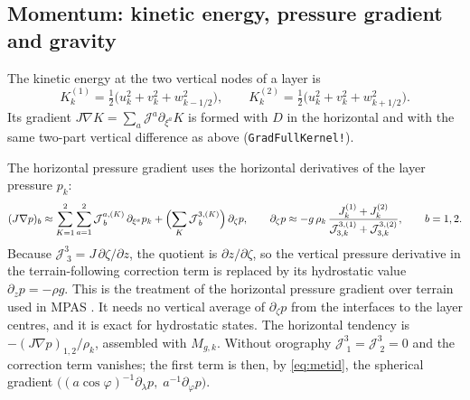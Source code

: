 \documentclass[11pt,a4paper]{article}
\newcommand{\Jm}{\mathcal{J}}
\newcommand{\code}[1]{\texttt{#1}}
\begin{document}
\subsection{Momentum: kinetic energy, pressure gradient and gravity}

The kinetic energy at the two vertical nodes of a layer is
\begin{equation}
  K^{(1)}_k = \tfrac12\bigl(u_k^2 + v_k^2 + w_{k-1/2}^2\bigr),\qquad
  K^{(2)}_k = \tfrac12\bigl(u_k^2 + v_k^2 + w_{k+1/2}^2\bigr).
\end{equation}
Its gradient $J\nabla K = \sum_a\Jm^a\partial_{\xi^a}K$ is formed with $D$ in
the horizontal and with the same two-part vertical difference as above
(\code{GradFullKernel!}).

The horizontal pressure gradient uses the horizontal derivatives of the
layer pressure $p_k$:
\begin{equation}
  (J\nabla p)_b \approx \sum_{K=1}^2\sum_{a=1}^2 \Jm^{a,(K)}_{\;b}\,\partial_{\xi^a}p_k
  + \Bigl(\sum_{K}\Jm^{3,(K)}_{\;b}\Bigr)\,\partial_\zeta p,
  \qquad
  \partial_\zeta p \approx -g\,\rho_k\,
  \frac{J^{(1)}_k + J^{(2)}_k}{\Jm^{3,(1)}_{3,k} + \Jm^{3,(2)}_{3,k}},
  \qquad b = 1,2.
\end{equation}
Because $\Jm^3_{\;3} = J\,\partial\zeta/\partial z$, the quotient is
$\partial z/\partial\zeta$, so the vertical pressure derivative in the
terrain-following correction term is replaced by its hydrostatic value
$\partial_z p = -\rho g$. This is the treatment of the horizontal pressure
gradient over terrain used in MPAS \cite{KlempSkamarock2021}. It needs no
vertical average of $\partial_\zeta p$ from the interfaces to the layer
centres, and it is exact for hydrostatic states. The horizontal tendency is
$-(J\nabla p)_{1,2}/\rho_k$, assembled with $M_{g,k}$. Without orography
$\Jm^3_{\;1} = \Jm^3_{\;2} = 0$ and the correction term vanishes; the first
term is then, by \eqref{eq:metid}, the spherical gradient
$\bigl((a\cos\varphi)^{-1}\partial_\lambda p,\; a^{-1}\partial_\varphi p\bigr)$.
\end{document}
